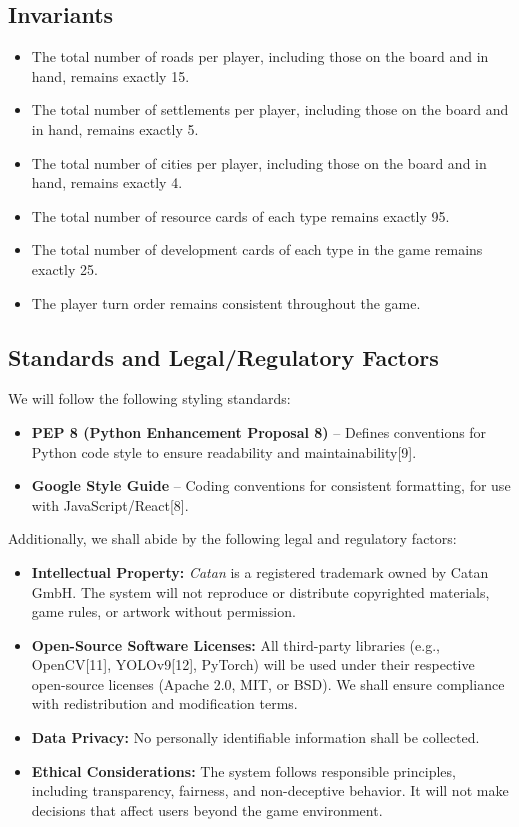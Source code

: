 \documentclass{article}
\begin{document}
\subsection{Invariants}\label{subsec:invariants}
\begin{itemize}
    \item The total number of roads per player, including those on the board and in hand, remains exactly 15.
    \item The total number of settlements per player, including those on the board and in hand, remains exactly 5.
    \item The total number of cities per player, including those on the board and in hand, remains exactly 4.
    \item The total number of resource cards of each type remains exactly 95.
    \item The total number of development cards of each type in the game remains exactly 25.
    \item The player turn order remains consistent throughout the game.
\end{itemize}


\subsection{Standards and Legal/Regulatory Factors}
We will follow the following styling standards:
\begin{itemize}
    \item \textbf{PEP 8 (Python Enhancement Proposal 8)} – Defines conventions for Python code style to ensure readability and maintainability[9].
    \item \textbf{Google Style Guide} – Coding conventions for consistent formatting, for use with JavaScript/React[8].
\end{itemize}

Additionally, we shall abide by the following legal and regulatory factors:
\begin{itemize}
    \item \textbf{Intellectual Property:}
    \emph{Catan} is a registered trademark owned by Catan GmbH. The system will not reproduce or distribute copyrighted materials, game rules, or artwork without permission.

    \item \textbf{Open-Source Software Licenses:}
    All third-party libraries (e.g., OpenCV[11], YOLOv9[12], PyTorch) will be used under their respective open-source licenses (Apache 2.0, MIT, or BSD). We shall ensure compliance with redistribution and modification terms.

    \item \textbf{Data Privacy:}
    No personally identifiable information shall be collected.

    \item \textbf{Ethical \AI{} Considerations:}
    The system follows responsible \AI{} principles, including transparency, fairness, and non-deceptive behavior. It will not make decisions that affect users beyond the game environment.
\end{itemize}
\end{document}
